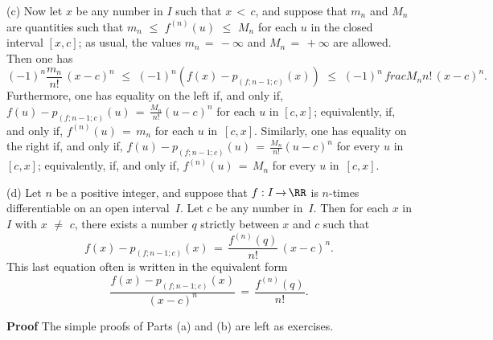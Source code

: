         (c) Now let $x$ be any number in $I$ such that $x\,<\,c$, and suppose that $m_{n}$ and $M_{n}$ are quantities such that 
    $m_{n}\,\,{\leq}\,\,f^{(n)}(u)\,\,{\leq}\,\,M_{n}$ for each $u$ in the closed interval $[x,c]$;
    as usual, the values $m_{n} \,=\, -{\infty}$ and $M_{n} \,=\, +{\infty}$ are allowed. Then one has
        \begin{displaymath}
        (-1)^{n}\frac{m_{n}}{n!}\,(x-c)^{n}
    \,\,{\leq}\,\,
        (-1)^{n}\left(f(x) - p_{(f;n-1;c)}(x)\right)
    \,\,{\leq}\,\,
        (-1)^{n}\,frac{M_{n}}{n!}\,(x-c)^{n}. 
        \end{displaymath}
    Furthermore, one has equality on the left if, and only if, ${\displaystyle f(u)- p_{(f;n-1;c)}(u) \,=\,  \frac{M_{n}}{n!}(u-c)^{n}}$
    for each $u$ in $[c,x]$; equivalently, if, and only if, $f^{(n)}(u) \,=\, m_{n}$ for each $u$ in~$[c,x]$.
        Similarly, one has equality on the right if, and only if, ${\displaystyle f(u)- p_{(f;n-1;c)}(u) \,=\,  \frac{M_{n}}{n!}(u-c)^{n}}$
    for every $u$ in $[c,x]$; equivalently, if, and only if, $f^{(n)}(u) \,=\, M_{n}$ for every $u$ in~$[c,x]$.


\V

        (d) Let $n$ be a positive integer, and suppose that $f:I \,{\rightarrow}\, {\RR}$ is $n$-times differentiable on an open interval~$I$.
    Let $c$ be any number in~$I$. Then for each $x$ in $I$ with $x \,\,{\neq}\,\, c$,
    there exists a number $q$ strictly between $x$ and $c$ such that
        \begin{displaymath}
        f(x) - p_{(f;n-1;c)}(x) \,=\, \frac{f^{(n)}(q)}{n!}\,(x-c)^{n}.
        \end{displaymath}
    This last equation often is written in the equivalent form
        \begin{displaymath}
        \frac{f(x) - p_{(f;n-1;c)}(x)}{(x-c)^{n}} \,=\, \frac{f^{(n)}(q)}{n!}.
        \end{displaymath}

\V

        {\bf Proof} The simple proofs of Parts (a) and (b) are left as exercises.

\V

